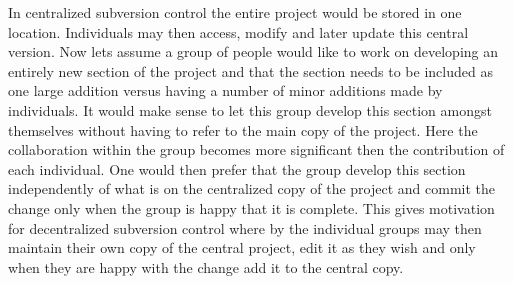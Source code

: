 In centralized subversion control the entire project would be stored in one location. Individuals may then access, modify and later update this central version. Now lets assume a group of people would like to work on developing an entirely new section of the project and that the section needs to be included as one large addition versus having a number of minor additions made by individuals. It would make sense to let this group develop this section amongst themselves without having to refer to the main copy of the project. Here the collaboration within the group becomes more significant then the contribution of each individual. One would then prefer that the group develop this section independently of what is on the centralized copy of the project and commit the change only when the group is happy that it is complete.  This gives motivation for decentralized subversion control where by the individual groups may then maintain their own copy of the central project, edit it as they wish and only when they are happy with the change add it to the central copy.

